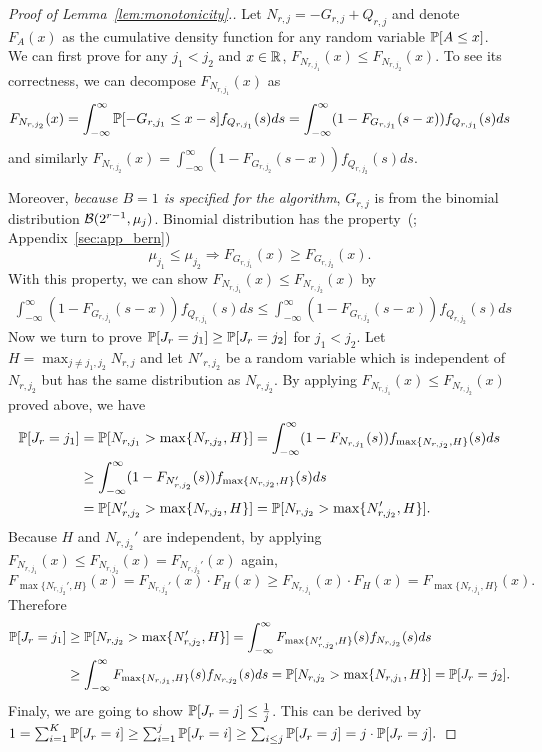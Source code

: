 \begin{proof}[Proof of Lemma~\ref{lem:monotonicity}.]
	Let $N_{r, j} = -G_{r, j}+Q_{r, j}$ and denote $F_{A}(x)$ as the cumulative density function for any random variable $\mathbb{P}[A\leq x]$. 
	We can first prove for any $j_1 < j_2$ and $x\in \mathbb{R}$, $F_{N_{r, j_1}}(x) \leq F_{N_{r, j_2}}(x)$.
	To see its correctness, we can decompose $F_{N_{r, j_1}}(x)$ as 
	$$F_{N_{r, j_2}}(x)= \int_{-\infty}^{\infty}\mathbb{P}[-G_{r, j_1}\leq x-s]f_{Q_{r, j_1}}(s)ds= \int_{-\infty}^{\infty}(1 - F_{G_{r, j_1}}(s-x))f_{Q_{r, j_1}}(s)ds$$ 
	and similarly $F_{N_{r, j_2}}(x)=\int_{-\infty}^{\infty}(1 - F_{G_{r, j_2}}(s-x))f_{Q_{r, j_2}}(s)ds$.
	 
	Moreover, \emph{because $B=1$ is specified for the algorithm}, $G_{r, j}$ is from the binomial distribution $\mathcal{B}(2^{r-1}, \mu_j)$.
	Binomial distribution has the property~(\citet{wadsworth1960introduction}; Appendix~\ref{sec:app_bern})
	$$\mu_{j_1}\leq\mu_{j_2}\Rightarrow F_{G_{r, j_1}}(x) \geq F_{G_{r, j_2}}(x).$$
	With this property, we can show $F_{N_{r, j_1}}(x) \leq F_{N_{r, j_2}}(x)$ by
	\begin{align*}
		\int_{-\infty}^{\infty}(1 - F_{G_{r, j_1}}(s-x))f_{Q_{r, j_1}}(s)ds
		\leq \int_{-\infty}^{\infty}(1 - F_{G_{r, j_2}}(s-x))f_{Q_{r, j_2}}(s)ds
	\end{align*}
	Now we turn to prove $\mathbb{P}[J_r = j_1]\geq \mathbb{P}[J_r = j_2]$ for $j_1 < j_2$. Let $H = \max_{j\neq j_1, j_2}N_{r, j}$ and let $N'_{r, j_2}$ be a random variable which is independent of $N_{r, j_2}$  but has the same distribution as $N_{r, j_2}$.
	By applying $F_{N_{r, j_1}}(x) \leq F_{N_{r, j_2}}(x)$ proved above, we have
	\begin{align*}
		\mathbb{P}[J_r = j_1] &= \mathbb{P}[N_{r, j_1}> \max\{N_{r, j_2}, H\}] = \int_{-\infty}^{\infty} (1 - F_{N_{r, j_1}}(s)) f_{\max\{N_{r, j_2}, H\}}(s)ds \\
		&\geq \int_{-\infty}^{\infty} (1 - F_{N_{r, j_2}'}(s)) f_{\max\{N_{r, j_2}, H\}}(s)ds\\
		&= \mathbb{P}[N_{r, j_2}'> \max\{N_{r, j_2}, H\}] = \mathbb{P}[N_{r, j_2}> \max\{N_{r, j_2}', H\}].
	\end{align*}
	Because $H$ and $N_{r, j_2}'$ are independent, by applying $F_{N_{r, j_1}}(x) \leq F_{N_{r, j_2}}(x) = F_{N_{r, j_2}'}(x)$ again,
	$
		F_{\max\{N_{r, j_2}', H\}}(x) = F_{N_{r, j_2}'}(x)\cdot F_{H}(x) \geq F_{N_{r, j_1}}(x)\cdot F_{H}(x) = F_{\max\{N_{r, j_1}, H\}}(x).
	$
	Therefore 
	\begin{align*}
		\mathbb{P}[J_r = j_1]&\geq \mathbb{P}[N_{r, j_2}> \max\{N_{r, j_2}', H\}]  = \int_{-\infty}^{\infty} F_{\max\{N_{r, j_2}', H\}}(s) f_{N_{r, j_2}}(s)ds \\
		&\geq \int_{-\infty}^{\infty} F_{\max\{N_{r, j_1}, H\}}(s) f_{N_{r, j_2}}(s)ds = \mathbb{P}[N_{r, j_2}> \max\{N_{r, j_1}, H\}] = \mathbb{P}[J_r = j_2].
	\end{align*}
	Finaly, we are going to show $\mathbb{P}[J_r = j]\leq \frac{1}{j}$. This can be derived by
	$
	1 = \sum_{i=1}^{K} \mathbb{P}[J_r = i] \geq \sum_{i=1}^{j} \mathbb{P}[J_r = i] \geq \sum_{i\leq j} \mathbb{P}[J_r = j] = j\cdot \mathbb{P}[J_r = j].
	$
\end{proof}

